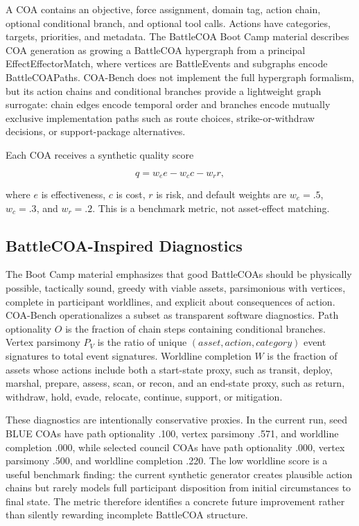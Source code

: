 \documentclass[letterpaper]{article}
\begin{document}
A COA contains an objective, force assignment, domain tag, action chain, optional conditional branch, and optional tool calls. Actions have categories, targets, priorities, and metadata. The BattleCOA Boot Camp material describes COA generation as growing a BattleCOA hypergraph from a principal EffectEffectorMatch, where vertices are BattleEvents and subgraphs encode BattleCOAPaths. COA-Bench does not implement the full hypergraph formalism, but its action chains and conditional branches provide a lightweight graph surrogate: chain edges encode temporal order and branches encode mutually exclusive implementation paths such as route choices, strike-or-withdraw decisions, or support-package alternatives.

Each COA receives a synthetic quality score

\begin{equation}
q = w_e e - w_c c - w_r r,
\end{equation}

where $e$ is effectiveness, $c$ is cost, $r$ is risk, and default weights are $w_e=.5$, $w_c=.3$, and $w_r=.2$. This is a benchmark metric, not asset-effect matching.

\subsection{BattleCOA-Inspired Diagnostics}

The Boot Camp material emphasizes that good BattleCOAs should be physically possible, tactically sound, greedy with viable assets, parsimonious with vertices, complete in participant worldlines, and explicit about consequences of action. COA-Bench operationalizes a subset as transparent software diagnostics. Path optionality $O$ is the fraction of chain steps containing conditional branches. Vertex parsimony $P_V$ is the ratio of unique $(asset, action, category)$ event signatures to total event signatures. Worldline completion $W$ is the fraction of assets whose actions include both a start-state proxy, such as transit, deploy, marshal, prepare, assess, scan, or recon, and an end-state proxy, such as return, withdraw, hold, evade, relocate, continue, support, or mitigation.

These diagnostics are intentionally conservative proxies. In the current run, seed BLUE COAs have path optionality .100, vertex parsimony .571, and worldline completion .000, while selected council COAs have path optionality .000, vertex parsimony .500, and worldline completion .220. The low worldline score is a useful benchmark finding: the current synthetic generator creates plausible action chains but rarely models full participant disposition from initial circumstances to final state. The metric therefore identifies a concrete future improvement rather than silently rewarding incomplete BattleCOA structure.
\end{document}
